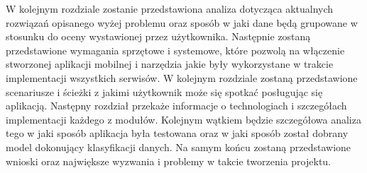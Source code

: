 \documentclass[a4paper,twoside,12pt]{book}
\begin{document}
W kolejnym rozdziale zostanie przedstawiona analiza dotycząca aktualnych rozwiązań opisanego wyżej problemu oraz sposób w jaki dane będą grupowane w stosunku do oceny wystawionej przez użytkownika. Następnie zostaną przedstawione wymagania sprzętowe i systemowe, które pozwolą na włączenie stworzonej aplikacji mobilnej i narzędzia jakie były wykorzystane w trakcie implementacji wszystkich serwisów. W kolejnym rozdziale zostaną przedstawione scenariusze i ścieżki z jakimi użytkownik może się spotkać posługując się aplikacją. Następny rozdział przekaże informacje o technologiach i szczegółach implementacji każdego z modułów. Kolejnym wątkiem będzie szczegółowa analiza tego w jaki sposób aplikacja była testowana oraz w jaki sposób został dobrany model dokonujący klasyfikacji danych. Na samym końcu zostaną przedstawione wnioski oraz największe wyzwania i problemy w takcie tworzenia projektu.
\end{document}
